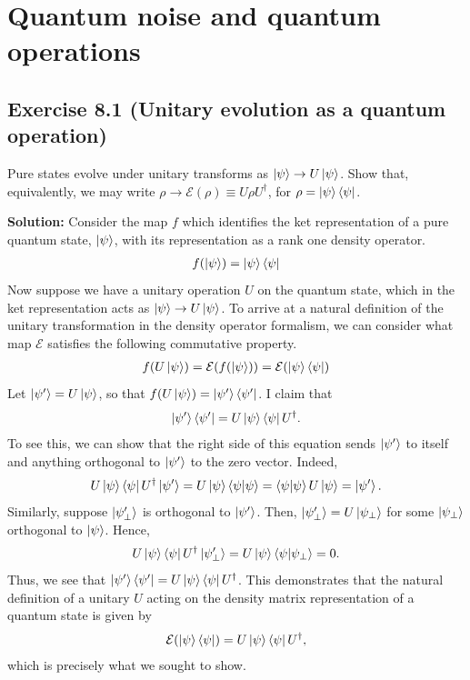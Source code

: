 \documentclass{book}
\newcommand{\mc}[1]{\mathcal{#1}}
\begin{document}
\chapter{Quantum noise and quantum operations}

\section*{Exercise 8.1 (Unitary evolution as a quantum operation)}
    Pure states evolve under unitary transforms as $\ket{\psi}\rightarrow U\ket{\psi}$. Show that, equivalently, we may write $\rho \rightarrow \mc{E}(\rho) \equiv U \rho U^\dagger$, for $\rho = \ket{\psi}\bra{\psi}$.
    
    \textbf{Solution:} Consider the map $f$ which identifies the ket representation of a pure quantum state, $\ket{\psi}$, with its representation as a rank one density operator.
    \begin{align}
        f(\ket{\psi}) = \ket{\psi}\bra{\psi}
    \end{align}
    Now suppose we have a unitary operation $U$ on the quantum state, which in the ket representation acts as $\ket{\psi}\to U\ket{\psi}$. To arrive at a natural definition of the unitary transformation in the density operator formalism, we can consider what map $\mc{E}$ satisfies the following commutative property.
    \begin{align}
        f(U\ket{\psi}) = \mc{E}(f(\ket{\psi})) = \mc{E}(\ket{\psi}\bra{\psi})
    \end{align}
    Let $\ket{\psi'} = U\ket{\psi}$, so that $f(U\ket{\psi}) = \ket{\psi'}\bra{\psi'}$. I claim that
    \begin{align}
        \ket{\psi'}\bra{\psi'} = U \ket{\psi}\bra{\psi} U^\dagger.
    \end{align}
    To see this, we can show that the right side of this equation sends $\ket{\psi'}$ to itself and anything orthogonal to $\ket{\psi'}$ to the zero vector. Indeed,
    \begin{align}
        U\ket{\psi}\bra{\psi}U^\dagger \ket{\psi'} = U \ket{\psi}\bra{\psi}\ket{\psi} = \bra{\psi}\ket{\psi} U \ket{\psi} = \ket{\psi'}.
    \end{align}
    Similarly, suppose $\ket{\psi'_\perp}$ is orthogonal to $\ket{\psi'}$. Then, $\ket{\psi'_\perp} = U \ket{\psi_\perp}$ for some $\ket{\psi_\perp}$ orthogonal to $\ket{\psi}$. Hence,
    \begin{align}
         U\ket{\psi}\bra{\psi}U^\dagger \ket{\psi'_\perp} = U\ket{\psi}\bra{\psi} \ket{\psi_\perp} = 0.
    \end{align}
    Thus, we see that $\ket{\psi'}\bra{\psi'} = U\ket{\psi}\bra{\psi}U^\dagger$. This demonstrates that the natural definition of a unitary $U$ acting on the density matrix representation of a quantum state is given by
    \begin{align}
        \mc{E}(\ket{\psi}\bra{\psi}) = U\ket{\psi}\bra{\psi}U^\dagger,
    \end{align}
    which is precisely what we sought to show. 
    
\end{document}
